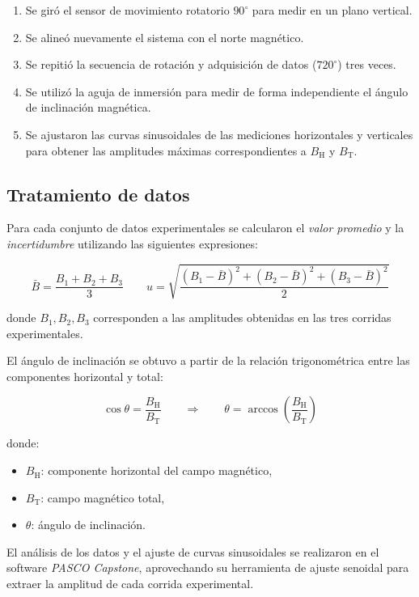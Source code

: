 \documentclass[12pt,a4paper]{article}
\begin{document}
\begin{enumerate}
    \item Se giró el sensor de movimiento rotatorio \( 90^\circ \) para medir en un plano vertical.
    \item Se alineó nuevamente el sistema con el norte magnético.
    \item Se repitió la secuencia de rotación y adquisición de datos (\( 720^\circ \)) tres veces.
    \item Se utilizó la aguja de inmersión para medir de forma independiente el ángulo de inclinación magnética.
    \item Se ajustaron las curvas sinusoidales de las mediciones horizontales y verticales para obtener las amplitudes máximas correspondientes a \( B_\mathrm{H} \) y \( B_\mathrm{T} \).
\end{enumerate}

\vspace{0.5em}

\subsection{Tratamiento de datos}

Para cada conjunto de datos experimentales se calcularon el \textit{valor promedio} y la \textit{incertidumbre} utilizando las siguientes expresiones:

\[
\bar{B} = \frac{B_1 + B_2 + B_3}{3}
\qquad
u = \sqrt{\frac{(B_1 - \bar{B})^2 + (B_2 - \bar{B})^2 + (B_3 - \bar{B})^2}{2}}
\]

donde \( B_1, B_2, B_3 \) corresponden a las amplitudes obtenidas en las tres corridas experimentales.

El ángulo de inclinación se obtuvo a partir de la relación trigonométrica entre las componentes horizontal y total:

\[
\cos \theta = \frac{B_\mathrm{H}}{B_\mathrm{T}}
\qquad \Rightarrow \qquad
\theta = \arccos\left(\frac{B_\mathrm{H}}{B_\mathrm{T}}\right)
\]

donde:
\begin{itemize}
    \item \( B_\mathrm{H} \): componente horizontal del campo magnético,
    \item \( B_\mathrm{T} \): campo magnético total,
    \item \( \theta \): ángulo de inclinación.
\end{itemize}

El análisis de los datos y el ajuste de curvas sinusoidales se realizaron en el software \textit{PASCO Capstone}, aprovechando su herramienta de ajuste senoidal para extraer la amplitud de cada corrida experimental.
\end{document}
